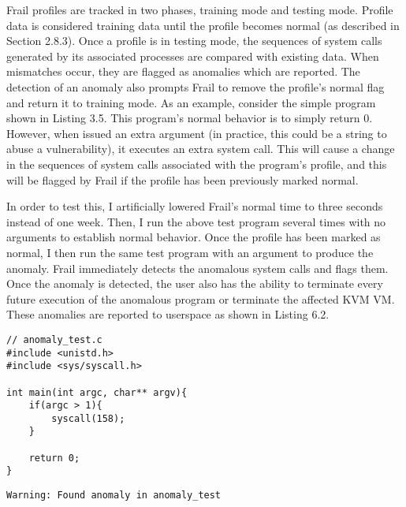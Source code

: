 \documentclass{report}
\begin{document}
\begin{spacing}{1.5}
{\large
Frail profiles are tracked in two phases, training mode and testing mode. Profile data is considered training data until the profile becomes normal (as described in Section 2.8.3). Once a profile is in testing mode, the sequences of system calls generated by its associated processes are compared with existing data. When mismatches occur, they are flagged as anomalies which are reported. The detection of an anomaly also prompts Frail to remove the profile’s normal flag and return it to training mode. As an example, consider the simple program shown in Listing 3.5. This program’s normal behavior is to simply return 0. However, when issued an extra argument (in practice, this could be a string to abuse a vulnerability), it executes an extra system call. This will cause a change in the sequences of system calls associated with the program’s profile, and this will be flagged by Frail if the profile has been previously marked normal.
\leavevmode\newline
}

{\large
\noindent In order to test this, I artificially lowered Frail's normal time to three seconds instead of one week. Then, I run the above test program several times with no arguments to establish normal behavior. Once the profile has been marked as normal, I then run the same test program with an argument to produce the anomaly. Frail immediately detects the anomalous system calls and flags them. Once the anomaly is detected, the user also has the ability to terminate every future execution of the anomalous program or terminate the affected KVM VM. These anomalies are reported to userspace as shown in Listing 6.2.
\leavevmode\newline
}


\begin{lstlisting}[caption={A simple C program to demonstrate anomaly detection in Frail.},captionpos=b]
// anomaly_test.c
#include <unistd.h>
#include <sys/syscall.h>

int main(int argc, char** argv){
    if(argc > 1){
        syscall(158);
    }

    return 0;
}
\end{lstlisting}

\leavevmode\newline

\begin{lstlisting}[caption={A simple C program to demonstrate anomaly detection in Frail.},captionpos=b]
Warning: Found anomaly in anomaly_test
\end{lstlisting}




\end{spacing}
\end{document}
